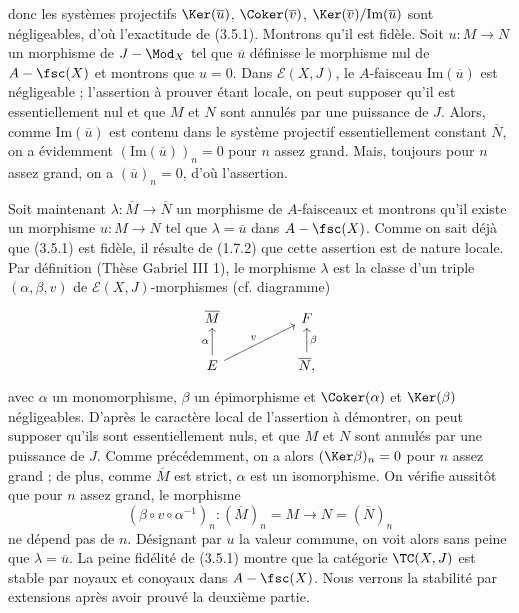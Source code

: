 donc les systèmes projectifs $\Ker (\overline{u})$, $\Coker (\overline{v})$, $\Ker (\overline{v})/\text{Im} (\overline{u})$ sont négligeables, d'où l'exactitude de (3.5.1). Montrons qu'il est fidèle. Soit $u: M \to N$ un morphisme de $J-\Mod_X$ tel que $\overline{u}$ définisse le morphisme nul de $A-\fsc(X)$ et montrons que $u = 0$. Dans $\mathcal{E}(X, J)$, le $A$-faisceau $\text{Im}(\overline{u})$ est négligeable ; l'assertion à prouver étant locale, on peut supposer qu'il est essentiellement nul et que $M$ et $N$ sont annulés par une puissance de $J$. Alors, comme $\text{Im}(\overline{u})$ est contenu dans le système projectif essentiellement constant $\overline{N}$, on a évidemment $(\text{Im}(\overline{u}))_n = 0$ pour $n$ assez grand. Mais, toujours pour $n$ assez grand, on a $(\overline{u})_n = 0$, d'où l'assertion.

Soit maintenant $\lambda: \overline{M} \to \overline{N}$ un morphisme de $A$-faisceaux et montrons qu'il existe un morphisme $u: M \to N$ tel que $\lambda = \overline{u}$ dans $A-\fsc(X)$. Comme on sait déjà que (3.5.1) est fidèle, il résulte de (1.7.2) que cette assertion est de nature locale. Par définition (Thèse Gabriel III 1), le morphisme $\lambda$ est la classe d'un triple $(\alpha, \beta, v)$ de $\mathcal{E}(X, J)$-morphismes (cf. diagramme)
\[\begin{tikzcd}
	{\overline{M}} && F \\
	E && {\overline{N},}
	\arrow["\beta"', from=2-3, to=1-3]
	\arrow["v", from=2-1, to=1-3]
	\arrow["\alpha", from=2-1, to=1-1]
\end{tikzcd}\]
avec $\alpha$ un monomorphisme, $\beta$ un épimorphisme et $\Coker(\alpha)$ et $\Ker (\beta)$ négligeables. D'après le caractère local de l'assertion à démontrer, on peut supposer qu'ils sont essentiellement nuls, et que $M$ et $N$ sont annulés par une puissance de $J$. Comme précédemment, on a alors $(\Ker \beta)_n = 0$ pour $n$ assez grand ; de plus, comme $\overline{M}$ est strict, $\alpha$ est un isomorphisme. On vérifie aussitôt que pour $n$ assez grand, le morphisme
$$
(\beta \circ v \circ \alpha^{-1})_n : (\overline{M})_n = M \to N = (\overline{N})_n
$$
ne dépend pas de $n$. Désignant par $u$ la valeur commune, on voit alors sans peine que $\lambda = \overline{u}$. La peine fidélité de (3.5.1) montre que la catégorie $\TC (X, J)$ est stable par noyaux et conoyaux dans $A-\fsc(X)$. Nous verrons la stabilité par extensions après avoir prouvé la deuxième partie.

